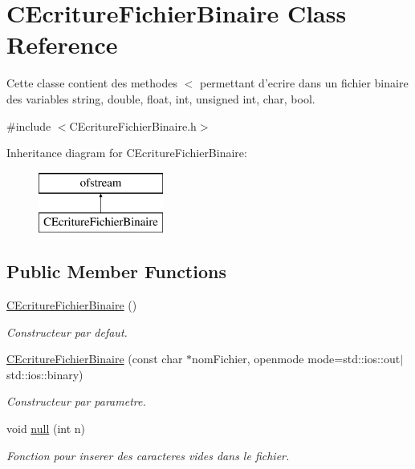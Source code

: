 \hypertarget{class_c_ecriture_fichier_binaire}{\section{C\-Ecriture\-Fichier\-Binaire Class Reference}
\label{class_c_ecriture_fichier_binaire}
}


Cette classe contient des methodes $<$ permettant d'ecrire dans un fichier binaire des variables string, double, float, int, unsigned int, char, bool.  




{\ttfamily \#include $<$C\-Ecriture\-Fichier\-Binaire.\-h$>$}

Inheritance diagram for C\-Ecriture\-Fichier\-Binaire\-:\begin{figure}[H]
\begin{center}
\leavevmode
\includegraphics[height=2.000000cm]{class_c_ecriture_fichier_binaire}
\end{center}
\end{figure}
\subsection*{Public Member Functions}
\begin{DoxyCompactItemize}
\item 
\hyperlink{group__utilitaire_ga5b5846202001fecd71cd2a0afbbdb494}{C\-Ecriture\-Fichier\-Binaire} ()
\begin{DoxyCompactList}\small\item\em Constructeur par defaut. \end{DoxyCompactList}\item 
\hyperlink{group__utilitaire_gad19b9753aa12a9f25fd0febc3c899024}{C\-Ecriture\-Fichier\-Binaire} (const char $\ast$nom\-Fichier, openmode mode=std\-::ios\-::out$\vert$std\-::ios\-::binary)
\begin{DoxyCompactList}\small\item\em Constructeur par parametre. \end{DoxyCompactList}\item 
void \hyperlink{group__utilitaire_ga7145545254c30909311d3b1ef0bdd07a}{null} (int n)
\begin{DoxyCompactList}\small\item\em Fonction pour inserer des caracteres vides dans le fichier. \end{DoxyCompactList}\end{DoxyCompactItemize}
